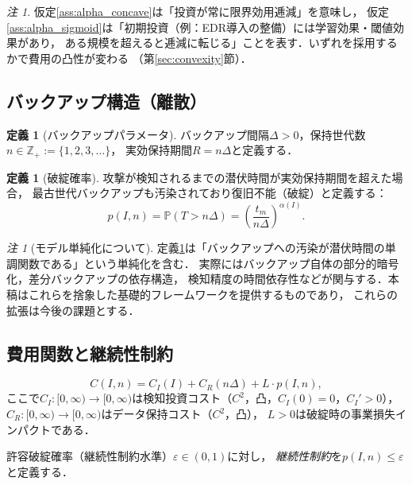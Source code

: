 \documentclass[12pt,a4paper]{article}
\theoremstyle{plain}
\theoremstyle{definition}
\newtheorem{definition}[theorem]{定義}
\theoremstyle{remark}
\newtheorem{remark}[theorem]{注}
\newcommand{\Z}{\mathbb{Z}}
\newcommand{\Prob}{\mathbb{P}}
\begin{document}
\begin{remark}
仮定\ref{ass:alpha_concave}は「投資が常に限界効用逓減」を意味し，
仮定\ref{ass:alpha_sigmoid}は「初期投資（例：EDR導入の整備）には学習効果・閾値効果があり，
ある規模を超えると逓減に転じる」ことを表す．いずれを採用するかで費用の凸性が変わる
（第\ref{sec:convexity}節）．
\end{remark}

\subsection{バックアップ構造（離散）}

\begin{definition}[バックアップパラメータ]
バックアップ間隔$\Delta > 0$，保持世代数$n \in \Z_+ := \{1,2,3,\ldots\}$，
実効保持期間$R = n\Delta$と定義する．
\end{definition}

\begin{definition}[破綻確率]\label{def:failure}
攻撃が検知されるまでの潜伏時間が実効保持期間を超えた場合，
最古世代バックアップも汚染されており復旧不能（破綻）と定義する：
\begin{equation}\label{eq:pfail}
  p(I,n) = \Prob(T > n\Delta) = \left(\frac{t_m}{n\Delta}\right)^{\alpha(I)}.
\end{equation}
\end{definition}

\begin{remark}[モデル単純化について]
定義\ref{def:failure}は「バックアップへの汚染が潜伏時間の単調関数である」という単純化を含む．
実際にはバックアップ自体の部分的暗号化，差分バックアップの依存構造，
検知精度の時間依存性などが関与する．本稿はこれらを捨象した基礎的フレームワークを提供するものであり，
これらの拡張は今後の課題とする．
\end{remark}

\subsection{費用関数と継続性制約}

\begin{equation}\label{eq:cost}
  C(I,n) = C_I(I) + C_R(n\Delta) + L \cdot p(I,n),
\end{equation}
ここで$C_I : [0,\infty) \to [0,\infty)$は検知投資コスト（$C^2$，凸，$C_I(0)=0$，$C_I'>0$），
$C_R : [0,\infty) \to [0,\infty)$はデータ保持コスト（$C^2$，凸），
$L > 0$は破綻時の事業損失インパクトである．

許容破綻確率（継続性制約水準）$\varepsilon \in (0,1)$に対し，
\emph{継続性制約}を$p(I,n) \le \varepsilon$と定義する．
\end{document}
